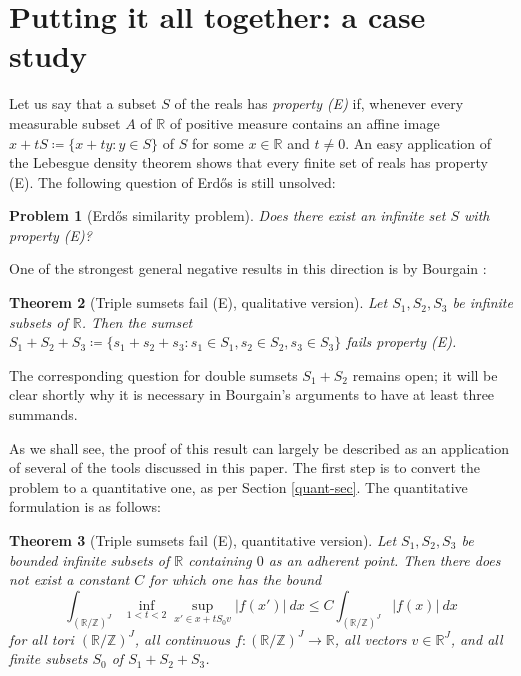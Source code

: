 \documentclass[12pt,a4paper,reqno]{amsart}
\numberwithin{equation}{section}
\theoremstyle{plain}
\newtheorem{theorem}{Theorem}[section]
\newtheorem{problem}[theorem]{Problem}
\theoremstyle{definition}
\newcommand\R{\mathbb{R}}
\newcommand\Z{\mathbb{Z}}
\begin{document}
\section{Putting it all together: a case study}\label{case}

Let us say that a subset $S$ of the reals has \emph{property (E)} if, whenever every measurable subset $A$ of $\R$ of positive measure contains an affine image $x+tS \coloneqq \{ x+ty: y \in S \}$ of $S$ for some $x \in \R$ and $t \neq 0$.  An easy application of the Lebesgue density theorem shows that every finite set of reals has property (E).  The following question of Erd\H{o}s is still unsolved:

\begin{problem}[Erd\H{o}s similarity problem] Does there exist an infinite set $S$ with property (E)? 
\end{problem}

One of the strongest general negative results in this direction is by Bourgain \cite{similarity}:

\begin{theorem}[Triple sumsets fail (E), qualitative version]\label{qual}  Let $S_1,S_2,S_3$ be infinite subsets of $\R$.  Then the sumset $S_1+S_2+S_3 \coloneqq  \{s_1+s_2+s_3: s_1 \in S_1, s_2 \in S_2, s_3 \in S_3\}$ fails property (E).
\end{theorem}

The corresponding question for double sumsets $S_1+S_2$ remains open; it will be clear shortly why it is necessary in Bourgain's arguments to have at least three summands.

As we shall see, the proof of this result can largely be described as an application of several of the tools discussed in this paper.  The first step is to convert the problem to a quantitative one, as per Section \ref{quant-sec}.  The quantitative formulation is as follows:

\begin{theorem}[Triple sumsets fail (E), quantitative version]\label{quant}  Let $S_1,S_2,S_3$ be bounded infinite subsets of $\R$ containing $0$ as an adherent point.  Then there does not exist a constant $C$ for which one has the bound
$$ \int_{(\R/\Z)^J} \inf_{1 < t < 2} \sup_{x' \in x+t S_0 v} |f(x')|\ dx \leq C \int_{(\R/\Z)^J} |f(x)|\ dx$$
for all tori $(\R/\Z)^J$, all continuous $f: (\R/\Z)^J \to \R$, all vectors $v \in \R^J$, and all finite subsets $S_0$ of $S_1+S_2+S_3$.
\end{theorem}
\end{document}

